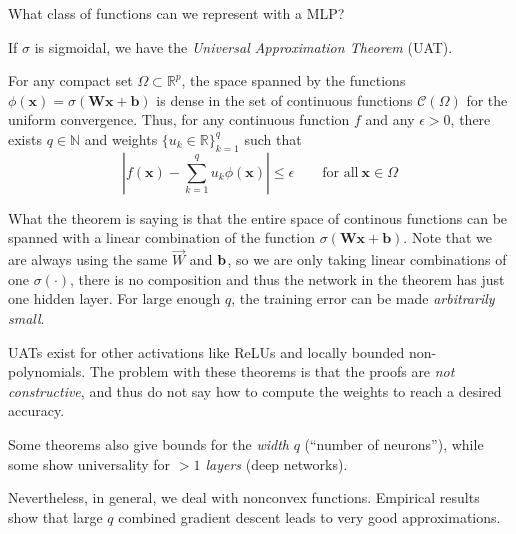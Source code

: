 
What class of functions can we represent with a MLP?

If $\sigma$ is sigmoidal, we have the \emph{Universal Approximation Theorem} (UAT).

\begin{thm}
    For any compact set $\Omega \subset\mathbb{R}^p$, the space spanned by the functions $\phi(\mathbf{x}) = \sigma(\mathbf{Wx}+\mathbf{b})$ is dense in the set of continuous functions $\mathcal{C}(\Omega)$ for the uniform convergence. Thus, for any continuous function $f$ and any $\epsilon>0$, there exists $q\in\mathbb{N}$ and weights $\{ u_k \in \mathbb{R} \}_{k=1}^{q}$ such that
		\begin{equation}
		| f(\mathbf{x}) - \sum_{k=1}^q u_k \phi (\mathbf{x}) | \le \epsilon \quad\quad\textrm{for all}~ \mathbf{x}\in\Omega
        \end{equation}
\end{thm}
What the theorem is saying is that the entire space of continous functions can be spanned with a linear combination of the function $\sigma(\mathbf{Wx}+\mathbf{b})$. 
Note that we are always using the same $\vec{W}$ and $\vb{b}$, so we are only taking linear combinations of one $\sigma(\cdot)$, there is no composition and thus the network in the theorem has just one hidden layer. For large enough $q$, the training error can be made \emph{arbitrarily small}.

UATs exist for other activations like ReLUs and locally bounded non-polynomials. The problem with these theorems is that the proofs are \emph{not constructive}, and thus do not say how to compute the weights to reach a desired accuracy.

Some theorems also give bounds for the \emph{width} $q$ (``number of neurons''), while some show universality for \emph{$>1$ layers} (deep networks).

Nevertheless, in general, we deal with nonconvex functions. Empirical results show that large $q$ combined gradient descent leads to very good approximations.